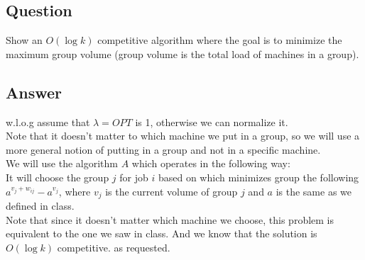 \subsection{Question}
Show an $O(\log k)$ competitive algorithm where the goal is to minimize the maximum group volume
(group volume is the total load of machines in a group).

\subsection{Answer}
w.l.o.g assume that $\lambda = OPT$ is 1, otherwise we can normalize it.\\
Note that it doesn't matter to which machine we put in a group, so we will use a 
more general notion of putting in a group and not in a specific machine.\\
We will use the algorithm $A$ which operates in the following way: \\
It will choose the group $j$ for job $i$ based on which minimizes group the following $ a^{v_j + w_{ij}} - a^{v_j} $, where $v_j$ is the current volume of group $j$ and $a$ is the same as we defined in class.\\
Note that since it doesn't matter which machine we choose, this problem is equivalent to the one we saw in class. And we know that the solution is $O(\log k)$ competitive. as requested.\\